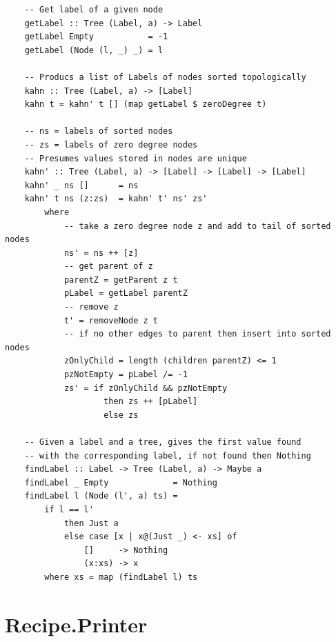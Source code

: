 \documentclass[11pt]{article}
\begin{document}
\begin{tt}
\begin{lstlisting}
    -- Get label of a given node
    getLabel :: Tree (Label, a) -> Label
    getLabel Empty           = -1
    getLabel (Node (l, _) _) = l
    
    -- Producs a list of Labels of nodes sorted topologically
    kahn :: Tree (Label, a) -> [Label]
    kahn t = kahn' t [] (map getLabel $ zeroDegree t)
    
    -- ns = labels of sorted nodes
    -- zs = labels of zero degree nodes
    -- Presumes values stored in nodes are unique
    kahn' :: Tree (Label, a) -> [Label] -> [Label] -> [Label]
    kahn' _ ns []      = ns
    kahn' t ns (z:zs)  = kahn' t' ns' zs'
        where
            -- take a zero degree node z and add to tail of sorted nodes
            ns' = ns ++ [z]
            -- get parent of z
            parentZ = getParent z t
            pLabel = getLabel parentZ
            -- remove z
            t' = removeNode z t
            -- if no other edges to parent then insert into sorted nodes
            zOnlyChild = length (children parentZ) <= 1
            pzNotEmpty = pLabel /= -1 
            zs' = if zOnlyChild && pzNotEmpty
                    then zs ++ [pLabel]
                    else zs
    
    -- Given a label and a tree, gives the first value found
    -- with the corresponding label, if not found then Nothing
    findLabel :: Label -> Tree (Label, a) -> Maybe a
    findLabel _ Empty             = Nothing
    findLabel l (Node (l', a) ts) =
        if l == l'
            then Just a
            else case [x | x@(Just _) <- xs] of
                []     -> Nothing
                (x:xs) -> x
        where xs = map (findLabel l) ts
    \end{lstlisting}
    \end{tt}

    \section{Recipe.Printer}
\end{document}
